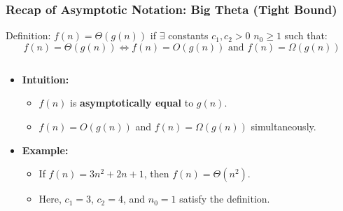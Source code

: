 \documentclass[10pt,aspectratio=43]{beamer}
\begin{document}
\begin{frame}
  \frametitle{Recap of Asymptotic Notation: Big Theta (Tight Bound)}

  \begin{block}{Definition:}
          \( f(n) = \Theta(g(n)) \) if $\exists$ constants $c_1, c_2 > 0$ 
          \land $n_0 \geq 1$ such that:
\[
f(n) = \Theta(g(n)) \iff f(n) = O(g(n)) \text{ and } f(n) = \Omega(g(n))
\]
\end{block}
  \begin{columns}

    \begin{column}{0.7\textwidth}
      \begin{itemize}
        \item \textbf{Intuition:}
        \begin{itemize}
            \item \( f(n) \) is \textbf{asymptotically equal} to \( g(n) \).
            \vspace{3pt}
            \item \( f(n) = O(g(n)) \) and \( f(n) = \Omega(g(n)) \) simultaneously.
        \end{itemize}
        \item \textbf{Example:}
        \begin{itemize}
            \item If \( f(n) = 3n^2 + 2n + 1 \), then \( f(n) = \Theta(n^2) \).
            \vspace{3pt}
            \item Here, \( c_1 = 3 \), \( c_2 = 4 \), and \( n_0 = 1 \) satisfy the definition.
        \end{itemize}
      \end{itemize}
    \end{column}


\end{columns}
\end{frame}
\end{document}
